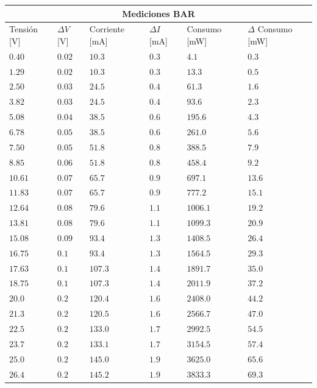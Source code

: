 \documentclass[12pt,a4paper]{article}
\begin{document}
			\begin{center}
			{\footnotesize \begin{tabular}{ |l|l|l|l|l|l| }

			\hline
				\multicolumn{6}{|c|}{\textbf{Mediciones BAR}}\\ \hline
				Tensión [V] & $\Delta V$ [V] & Corriente [mA] & $\Delta I$ [mA] & Consumo [mW] & $\Delta$ Consumo [mW]\\ \hline
				$0.40$  & $0.02$ & $ 10.3 $ &  $ 0.3 $ & $ 4.1 $   & $ 0.3 $ \\ \hline
				$1.29$  & $0.02$ & $ 10.3$ &   $ 0.3 $ & $ 13.3 $  & $ 0.5 $ \\ \hline
				$2.50$  & $0.03$ & $ 24.5 $ &  $ 0.4 $ & $ 61.3 $  & $ 1.6 $ \\ \hline
				$3.82$  & $0.03$ & $ 24.5 $ &  $ 0.4 $ & $ 93.6 $  & $ 2.3 $ \\ \hline
				$5.08$  & $0.04$ & $ 38.5 $ &  $ 0.6 $ & $ 195.6 $ & $ 4.3 $ \\ \hline
				$6.78$  & $0.05$ & $ 38.5 $ &  $ 0.6 $ & $ 261.0 $ & $ 5.6 $ \\ \hline
				$7.50$  & $0.05$ & $ 51.8 $ &  $ 0.8 $ & $ 388.5 $ & $ 7.9 $ \\ \hline
				$8.85$  & $0.06$ & $ 51.8 $ &  $ 0.8 $ & $ 458.4 $ & $ 9.2 $ \\ \hline
				$10.61$ & $0.07$ & $ 65.7 $ &  $ 0.9 $ & $ 697.1 $ & $ 13.6 $ \\ \hline
				$11.83$ & $0.07$ & $ 65.7 $ &  $ 0.9 $ & $ 777.2 $ & $ 15.1 $ \\ \hline
				$12.64$ & $0.08$ & $ 79.6 $ &  $ 1.1 $ & $ 1006.1 $ & $ 19.2 $ \\ \hline
				$13.81$ & $0.08$ & $ 79.6 $ &  $ 1.1 $ & $ 1099.3 $ & $ 20.9 $ \\ \hline
				$15.08$ & $0.09$ & $ 93.4$ &   $ 1.3 $ & $  1408.5$ & $ 26.4 $ \\ \hline
				$16.75$ & $0.1$  & $ 93.4 $ &  $ 1.3 $ & $ 1564.5 $ & $ 29.3 $ \\ \hline
				$17.63$ & $0.1$  & $ 107.3 $ & $ 1.4 $ & $ 1891.7 $ & $ 35.0 $ \\ \hline
				$18.75$ & $0.1$  & $ 107.3 $ & $ 1.4 $ & $ 2011.9 $ & $ 37.2 $ \\ \hline
				$20.0$  & $0.2$  & $ 120.4 $ & $ 1.6 $ & $ 2408.0 $ & $ 44.2 $ \\ \hline
				$21.3$  & $0.2$  & $ 120.5 $ & $ 1.6 $ & $ 2566.7 $ & $ 47.0 $ \\ \hline
				$22.5$  & $0.2$  & $ 133.0 $ & $ 1.7 $ & $ 2992.5 $ & $ 54.5 $ \\ \hline
				$23.7$  & $0.2$  & $ 133.1 $ & $ 1.7 $ & $ 3154.5 $ & $ 57.4 $ \\ \hline
				$25.0$  & $0.2$  & $ 145.0 $ & $ 1.9 $ & $ 3625.0 $ & $ 65.6 $ \\ \hline
				$26.4$  & $0.2$  & $ 145.2 $ & $ 1.9 $ & $ 3833.3 $ & $ 69.3 $ \\ \hline
 				
				
			\end{tabular}}\label{tab:consumobar}
			\end{center}
\end{document}
